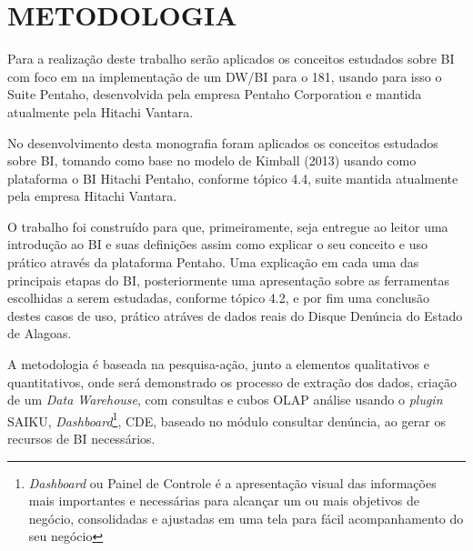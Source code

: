 %
%

\chapter{METODOLOGIA}

Para a realização deste trabalho serão aplicados os conceitos estudados sobre BI com foco em na implementa\c{c}\~{a}o de um DW/BI para o 181, usando para isso o Suite Pentaho, desenvolvida pela empresa Pentaho Corporation e mantida atualmente pela Hitachi Vantara.

No desenvolvimento desta monografia foram aplicados os conceitos estudados sobre BI, tomando como base no modelo de Kimball (2013) usando como  plataforma o BI Hitachi Pentaho, conforme tópico 4.4, suite mantida atualmente pela empresa Hitachi Vantara. 

O trabalho foi construído para que, primeiramente, seja entregue ao leitor uma introdução ao BI e suas definições assim como explicar o seu conceito e uso pr\'{a}tico através da plataforma Pentaho. Uma explicação em cada uma das principais etapas do BI, posteriormente uma apresentação sobre as ferramentas escolhidas a serem estudadas, conforme tópico 4.2, e por fim uma conclusão destes casos de uso, pr\'{a}tico atr\'{a}ves de dados reais do Disque Denúncia do Estado de Alagoas.

A metodologia é baseada na pesquisa-a\c{c}\~{a}o, junto a elementos qualitativos e quantitativos, onde ser\'{a} demonstrado os processo de extração dos dados,  cria\c{c}\~{a}o de um \textit{Data Warehouse}, com consultas e cubos OLAP an\'{a}lise usando o \textit{plugin} SAIKU, \textit{Dashboard}\footnote{\textit{Dashboard} ou Painel de Controle é a apresenta\c{c}\~{a}o visual das informa\c{c}ões mais importantes e necess\'{a}rias para alcan\c{c}ar um ou mais objetivos de negócio, consolidadas e ajustadas em uma tela para f\'{a}cil acompanhamento do seu negócio}, CDE, baseado no módulo consultar denúncia, ao gerar os recursos de BI necess\'{a}rios.